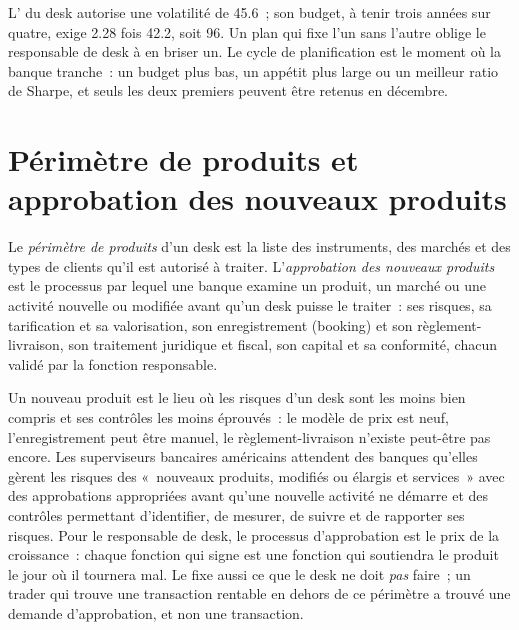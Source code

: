 \begin{remark}\label{rem:fm:the-head-of-desks-job:agree}
L' du desk autorise une volatilité de 45.6~; son budget, à tenir trois années sur quatre, exige 2.28 fois 42.2, soit 96. Un plan qui fixe
l'un sans l'autre oblige le responsable de desk à en briser un. Le cycle de planification est le moment où la banque tranche~: un budget plus bas, un appétit plus large
ou un meilleur ratio de Sharpe, et seuls les deux premiers peuvent être retenus en décembre.
\end{remark}

\section{Périmètre de produits et approbation des nouveaux produits}

\begin{definition}\label{def:fm:the-head-of-desks-job:scope}
Le \emph{périmètre de produits} d'un desk est la liste des instruments, des marchés et des types de clients qu'il est autorisé à traiter. L'\emph{approbation des nouveaux produits}
est le processus par lequel une banque examine un produit, un marché ou une activité nouvelle ou modifiée avant qu'un desk puisse
le traiter~: ses risques, sa tarification et sa valorisation, son enregistrement (booking) et son règlement-livraison, son traitement juridique et fiscal, son capital et sa conformité, chacun validé par la
fonction responsable.
\end{definition}

Un nouveau produit est le lieu où les risques d'un desk sont les moins bien compris et ses contrôles les moins éprouvés~: le modèle de prix est neuf, l'enregistrement peut être manuel, le
règlement-livraison n'existe peut-être pas encore. Les superviseurs bancaires américains attendent des banques qu'elles gèrent les risques des «~nouveaux produits, modifiés ou élargis
et services~» avec des approbations appropriées avant qu'une nouvelle activité ne démarre et des contrôles permettant d'identifier, de mesurer, de suivre et de rapporter ses risques. Pour le
responsable de desk, le processus d'approbation est le prix de la croissance~: chaque fonction qui signe est une fonction qui soutiendra le produit le jour où il tournera mal.
Le  fixe aussi ce que le desk ne doit \emph{pas} faire~; un trader qui trouve une transaction rentable en dehors de ce périmètre a trouvé une demande d'approbation, et non une
transaction.

